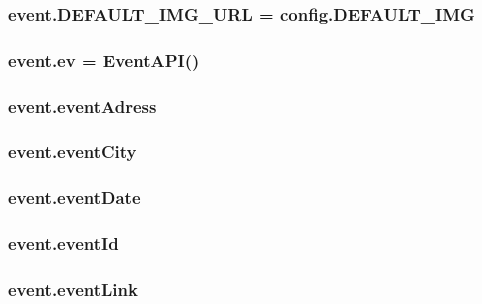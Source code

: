 \subsubsection[{D\+E\+F\+A\+U\+L\+T\+\_\+\+I\+M\+G\+\_\+\+U\+RL}]{\setlength{\rightskip}{0pt plus 5cm}event.\+D\+E\+F\+A\+U\+L\+T\+\_\+\+I\+M\+G\+\_\+\+U\+RL = {\bf config.\+D\+E\+F\+A\+U\+L\+T\+\_\+\+I\+MG}}\label{namespaceevent_aab9c95a699ad8cda8d5704956aa7074a}
\subsubsection[{ev}]{\setlength{\rightskip}{0pt plus 5cm}event.\+ev = {\bf Event\+A\+PI}()}\label{namespaceevent_aa0cb3e18f45c0ecc97b8ec27d928ad85}
\subsubsection[{event\+Adress}]{\setlength{\rightskip}{0pt plus 5cm}event.\+event\+Adress}\label{namespaceevent_a8ff455e0814ad1c95d54ebfd0aa5dec0}
\subsubsection[{event\+City}]{\setlength{\rightskip}{0pt plus 5cm}event.\+event\+City}\label{namespaceevent_a50dd53d95ef84a73290e424f4ca275b4}
\subsubsection[{event\+Date}]{\setlength{\rightskip}{0pt plus 5cm}event.\+event\+Date}\label{namespaceevent_a076e1536179d66e0c3ac02eac068de7b}
\subsubsection[{event\+Id}]{\setlength{\rightskip}{0pt plus 5cm}event.\+event\+Id}\label{namespaceevent_a6843cb1551d0dcf10be0dd8fda4b8cb4}
\subsubsection[{event\+Link}]{\setlength{\rightskip}{0pt plus 5cm}event.\+event\+Link}\label{namespaceevent_abb1ae651081a8397fe7ca51a18bfd28b}
